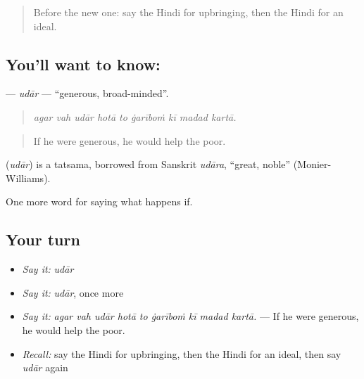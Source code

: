 \label{lesson:HI-C396-udar}



\begin{quote}
Before the new one: say the Hindi for upbringing, then the Hindi for an ideal.
\end{quote}

\subsection*{You'll want to know: }
\textbf{} — \emph{udār} — \textquotedblleft{}generous, broad-minded\textquotedblright{}.

\begin{quote}
        
\end{quote}

\begin{quote}
\emph{agar vah udār hotā to ġarīboṁ kī madad kartā.}
\end{quote}

\begin{quote}
If he were generous, he would help the poor.
\end{quote}

\begin{cousinweb}
\textbf{} (\emph{udār}) is a tatsama, borrowed from Sanskrit \emph{udāra}, \textquotedblleft{}great, noble\textquotedblright{} (Monier-Williams).
\end{cousinweb}

\begin{grammarlens}[title={What you've built}]
One more word for saying what happens if.
\end{grammarlens}

\subsection*{Your turn}
\begin{itemize}
\raggedright
  \item \emph{Say it:} \emph{udār}
  \item \emph{Say it:} \emph{udār}, once more
  \item \emph{Say it:} \emph{agar vah udār hotā to ġarīboṁ kī madad kartā.} — If he were generous, he would help the poor.
  \item \emph{Recall:} say the Hindi for upbringing, then the Hindi for an ideal, then say \emph{udār} again
\end{itemize}

